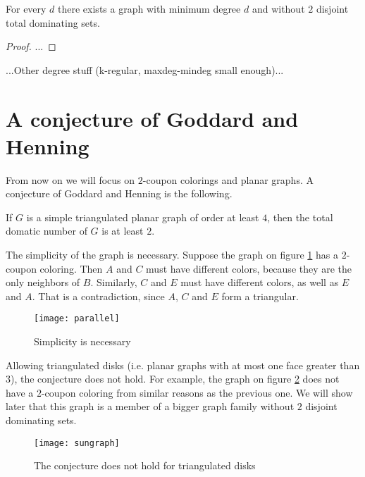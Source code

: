 \begin{thm}
  For every $d$ there exists a graph with minimum degree $d$ and without $2$
  disjoint total dominating sets.
\end{thm}
\begin{proof}
  ...
\end{proof}

...Other degree stuff (k-regular, maxdeg-mindeg small enough)...

\section{A conjecture of Goddard and Henning}

From now on we will focus on $2$-coupon colorings and planar graphs. A
conjecture of Goddard and Henning is the following.

\begin{conj}
  If $G$ is a simple triangulated planar graph of order at least $4$, then the
  total domatic number of $G$ is at least $2$.
\end{conj}

\begin{remark}
  The simplicity of the graph is necessary. Suppose the graph on figure
  \ref{fig:parallel} has a $2$-coupon coloring. Then $A$ and $C$ must have
  different colors, because they are the only neighbors of $B$. Similarly, $C$
  and $E$ must have different colors, as well as $E$ and $A$. That is a
  contradiction, since $A$, $C$ and $E$ form a triangular.
\end{remark}

\begin{figure}[h]
  \centering
  \texttt{[image: parallel]}
  \caption{Simplicity is necessary}
  \label{fig:parallel}
\end{figure}

\begin{remark}
  Allowing triangulated disks (i.e. planar graphs with at most one face greater
  than $3$), the conjecture does not hold. For example, the graph on figure
  \ref{fig:sungraph} does not have a $2$-coupon coloring from similar reasons as
  the previous one. We will show later that this graph is a member of a bigger
  graph family without $2$ disjoint dominating sets.
\end{remark}

\begin{figure}[ht]
  \centering
  \texttt{[image: sungraph]}
  \caption{The conjecture does not hold for triangulated disks}
  \label{fig:sungraph}
\end{figure}

